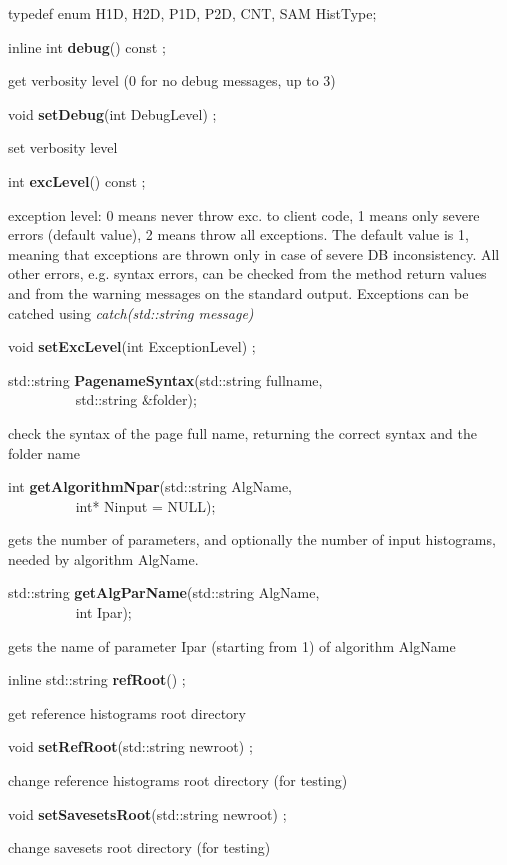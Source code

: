 \item   typedef enum { H1D, H2D, P1D, P2D, CNT, SAM} HistType;
\item    inline int {\bf debug}() const ;

 get verbosity level (0 for no debug messages, up to 3)


\item    void {\bf setDebug}(int DebugLevel) ;

 set verbosity level


\item    int {\bf excLevel}() const ;

 exception level: 0 means never throw exc. to client code, 1 means only
 severe errors (default value), 2 means throw all exceptions.
 The default value is 1, meaning that exceptions are thrown only in
 case of severe DB inconsistency. All other errors, e.g. syntax errors,
 can be checked from the method return values and from the warning
 messages on the standard output.
 Exceptions can be catched using {\it catch(std::string message)}


\item    void {\bf setExcLevel}(int ExceptionLevel) ;




\item    std::string {\bf PagenameSyntax}(std::string fullname,\\\mbox{}~~~~~~~~~ std::string \&folder);


 check the syntax of the page full name, returning the correct syntax and the folder name 


\item    int {\bf getAlgorithmNpar}(std::string AlgName,\\\mbox{}~~~~~~~~~
		       int* Ninput = NULL);

 gets the number of parameters, and optionally the number of input histograms, needed by algorithm AlgName.


\item    std::string {\bf getAlgParName}(std::string AlgName,\\\mbox{}~~~~~~~~~
			    int Ipar);

 gets the name of parameter Ipar (starting from 1) of algorithm AlgName


\item    inline std::string {\bf refRoot}() ;

 get reference histograms root directory 


\item    void {\bf setRefRoot}(std::string newroot) ;

 change reference histograms root directory (for testing)


\item    void {\bf setSavesetsRoot}(std::string newroot) ;

 change savesets root directory (for testing)


